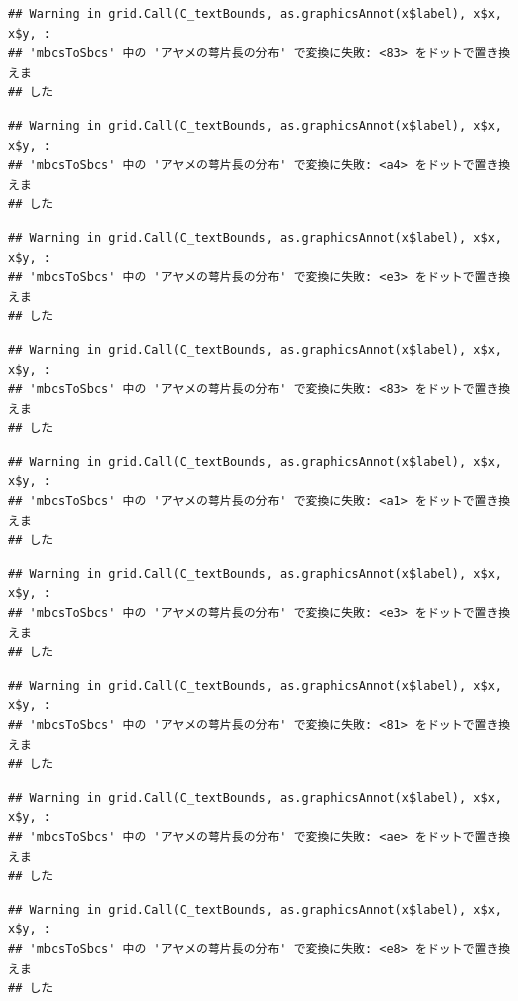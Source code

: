 \documentclass[
]{book}
\begin{document}
\begin{verbatim}
## Warning in grid.Call(C_textBounds, as.graphicsAnnot(x$label), x$x, x$y, :
## 'mbcsToSbcs' 中の 'アヤメの萼片長の分布' で変換に失敗: <83> をドットで置き換えま
## した
\end{verbatim}

\begin{verbatim}
## Warning in grid.Call(C_textBounds, as.graphicsAnnot(x$label), x$x, x$y, :
## 'mbcsToSbcs' 中の 'アヤメの萼片長の分布' で変換に失敗: <a4> をドットで置き換えま
## した
\end{verbatim}

\begin{verbatim}
## Warning in grid.Call(C_textBounds, as.graphicsAnnot(x$label), x$x, x$y, :
## 'mbcsToSbcs' 中の 'アヤメの萼片長の分布' で変換に失敗: <e3> をドットで置き換えま
## した
\end{verbatim}

\begin{verbatim}
## Warning in grid.Call(C_textBounds, as.graphicsAnnot(x$label), x$x, x$y, :
## 'mbcsToSbcs' 中の 'アヤメの萼片長の分布' で変換に失敗: <83> をドットで置き換えま
## した
\end{verbatim}

\begin{verbatim}
## Warning in grid.Call(C_textBounds, as.graphicsAnnot(x$label), x$x, x$y, :
## 'mbcsToSbcs' 中の 'アヤメの萼片長の分布' で変換に失敗: <a1> をドットで置き換えま
## した
\end{verbatim}

\begin{verbatim}
## Warning in grid.Call(C_textBounds, as.graphicsAnnot(x$label), x$x, x$y, :
## 'mbcsToSbcs' 中の 'アヤメの萼片長の分布' で変換に失敗: <e3> をドットで置き換えま
## した
\end{verbatim}

\begin{verbatim}
## Warning in grid.Call(C_textBounds, as.graphicsAnnot(x$label), x$x, x$y, :
## 'mbcsToSbcs' 中の 'アヤメの萼片長の分布' で変換に失敗: <81> をドットで置き換えま
## した
\end{verbatim}

\begin{verbatim}
## Warning in grid.Call(C_textBounds, as.graphicsAnnot(x$label), x$x, x$y, :
## 'mbcsToSbcs' 中の 'アヤメの萼片長の分布' で変換に失敗: <ae> をドットで置き換えま
## した
\end{verbatim}

\begin{verbatim}
## Warning in grid.Call(C_textBounds, as.graphicsAnnot(x$label), x$x, x$y, :
## 'mbcsToSbcs' 中の 'アヤメの萼片長の分布' で変換に失敗: <e8> をドットで置き換えま
## した
\end{verbatim}
\end{document}
